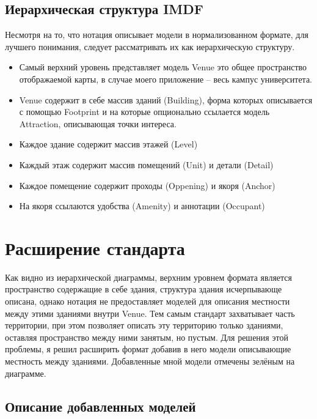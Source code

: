     \subsection{Иерархическая структура IMDF}
      Несмотря на то, что нотация описывает модели в нормализованном формате, для лучшего понимания, следует рассматривать их как иерархическую структуру.


      \begin{itemize}
        \item Самый верхний уровень представляет модель Venue это общее пространство отображаемой карты, в случае моего приложение -- весь кампус университета.
        \item Venue содержит в себе массив зданий (Building), форма которых описывается с помощью Footprint и на которые опционально ссылается модель Attraction, описывающая точки интереса.
        \item Каждое здание содержит массив этажей (Level)
        \item Каждый этаж содержит массив помещений (Unit) и детали (Detail)
        \item Каждое помещение содержит проходы (Oppening) и якоря (Anchor)
        \item На якоря ссылаются удобства (Amenity) и аннотации (Occupant)
      \end{itemize}

  \section{Расширение стандарта}
    Как видно из иерархической диаграммы, верхним уровнем формата является пространство содержащие в себе здания, структура здания исчерпывающе описана, однако нотация не предоставляет моделей для описания местности между этими зданиями внутри Venue. Тем самым стандарт захватывает часть территории, при этом позволяет описать эту территорию только зданиями, оставляя пространство между ними занятым, но пустым.
    Для решения этой проблемы, я решил расширить формат добавив в него модели описывающие местность между зданиями. Добавленные мной модели отмечены зелёным на диаграмме.

    \subsection{Описание добавленных моделей}
